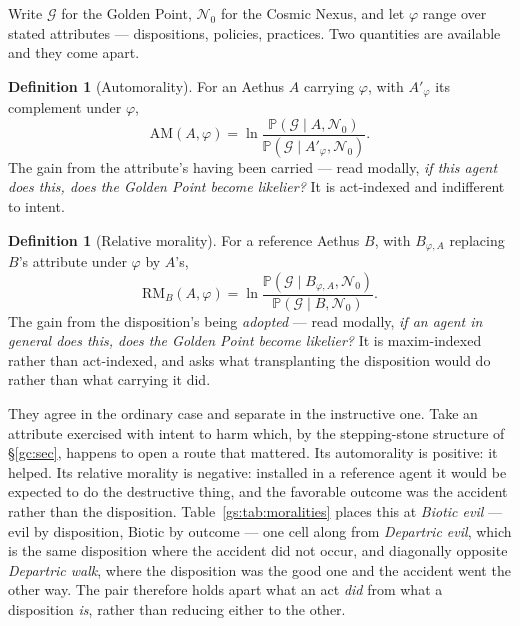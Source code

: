 \documentclass[11pt]{article}
\numberwithin{equation}{section}
\theoremstyle{plain}
\theoremstyle{definition}
\newtheorem{definition}[theorem]{Definition}
\theoremstyle{remark}
\newcommand{\PP}{\mathbb{P}}
\begin{document}
Write $\mathcal G$ for the Golden Point, $\mathcal N_0$ for the Cosmic
Nexus, and let $\varphi$ range over stated attributes --- dispositions,
policies, practices. Two quantities are available and they come apart.

\begin{definition}[Automorality]\label{gs:def:automorality}
For an Aethus $A$ carrying $\varphi$, with $A'_\varphi$ its complement
under $\varphi$,
\begin{equation}\label{gs:eq:am}
\mathrm{AM}(A,\varphi)=
\ln\frac{\PP(\mathcal G\mid A,\mathcal N_0)}
{\PP(\mathcal G\mid A'_\varphi,\mathcal N_0)} .
\end{equation}
The gain from the attribute's having been carried --- read modally,
\emph{if this agent does this, does the Golden Point become likelier?}
It is act-indexed and indifferent to intent.
\end{definition}

\begin{definition}[Relative morality]\label{gs:def:relmorality}
For a reference Aethus $B$, with $B_{\varphi,A}$ replacing $B$'s
attribute under $\varphi$ by $A$'s,
\begin{equation}\label{gs:eq:rm}
\mathrm{RM}_B(A,\varphi)=
\ln\frac{\PP(\mathcal G\mid B_{\varphi,A},\mathcal N_0)}
{\PP(\mathcal G\mid B,\mathcal N_0)} .
\end{equation}
The gain from the disposition's being \emph{adopted} --- read modally,
\emph{if an agent in general does this, does the Golden Point become
likelier?} It is maxim-indexed rather than act-indexed, and asks what
transplanting the disposition would do rather than what carrying it did.
\end{definition}

They agree in the ordinary case and separate in the instructive one. Take
an attribute exercised with intent to harm which, by the stepping-stone
structure of \S\ref{gc:sec}, happens to open a route that mattered. Its
automorality is positive: it helped. Its relative morality is negative:
installed in a reference agent it would be expected to do the destructive
thing, and the favorable outcome was the accident rather than the
disposition. Table~\ref{gs:tab:moralities} places this at \emph{Biotic evil} --- evil
by disposition, Biotic by outcome --- one cell along from \emph{Departric
evil}, which is the same disposition where the accident did not occur,
and diagonally opposite \emph{Departric walk}, where the disposition was
the good one and the accident went the other way. The pair therefore holds apart what an act \emph{did} from
what a disposition \emph{is}, rather than reducing either to the other.
\end{document}
